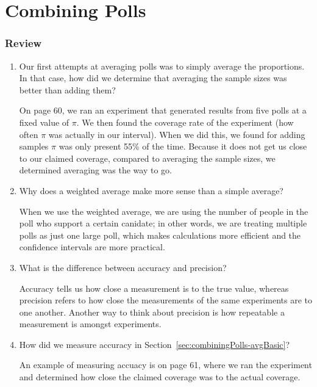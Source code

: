 \chapter{Combining Polls}\label{ch:combiningPolls}


\subsection*{Review}
\begin{enumerate}

 \item Our first attempts at averaging polls was to simply average the proportions. In that case, how did we determine that averaging the sample sizes was better than adding them?
\begin{solution}
On page 60, we ran an experiment that generated results from five polls at a fixed value of $\pi$. We then found the coverage rate of the experiment (how often $\pi$ was actually in our interval). When we did this, we found for adding samples $\pi$ was only present 55\% of the time. Because it does not get us close to our claimed coverage, compared to averaging the sample sizes, we determined averaging was the way to go.
\end{solution}

 \item Why does a weighted average make more sense than a simple average?
\begin{solution}
When we use the weighted average, we are using the number of people in the poll who support a certain canidate; in other words, we are treating multiple polls as just one large poll, which makes calculations more efficient and the confidence intervals are more practical. 
\end{solution}

 \item What is the difference between accuracy and precision?
\begin{solution}
Accuracy tells us how close a measurement is to the true value, whereas precision refers to how close the measurements of the same experiments are to one another. Another way to think about precision is how repeatable a measurement is amongst experiments. 
\end{solution}

 \item How did we measure accuracy in Section~\ref{sec:combiningPolls-avgBasic}?
\begin{solution}
An example of measuring accuacy is on page 61, where we ran the experiment and determined how close the claimed coverage was to the actual coverage. 
\end{solution}


\end{enumerate}
